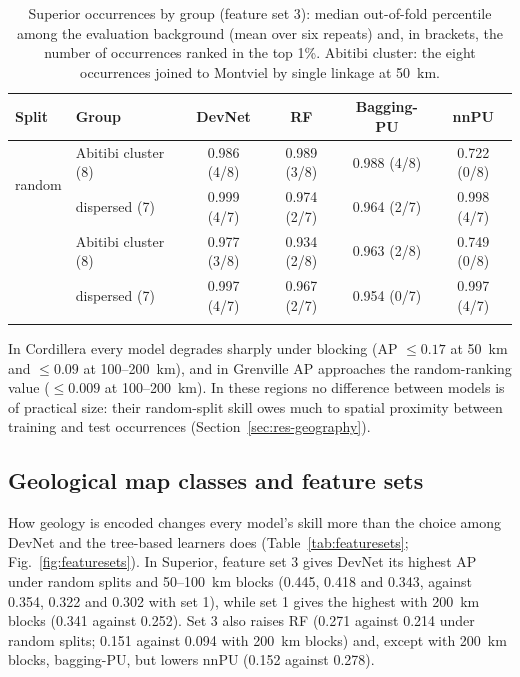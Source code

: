 \documentclass[pdflatex,sn-apa]{sn-jnl}
\begin{document}
\begin{table}[t]
\caption{Superior occurrences by group (feature set 3): median out-of-fold percentile among the evaluation background (mean over six repeats) and, in brackets, the number of occurrences ranked in the top 1\%. Abitibi cluster: the eight occurrences joined to Montviel by single linkage at 50~km.}\label{tab:occurrence}
\scriptsize
\setlength{\tabcolsep}{2.5pt}
\begin{tabular*}{\textwidth}{@{\extracolsep\fill}llcccc}
\toprule
Split & Group & DevNet & RF & Bagging-PU & nnPU \\
\midrule
\multirow{2}{*}{random} & Abitibi cluster (8) & 0.986 (4/8) & 0.989 (3/8) & 0.988 (4/8) & 0.722 (0/8) \\
 & dispersed (7) & 0.999 (4/7) & 0.974 (2/7) & 0.964 (2/7) & 0.998 (4/7) \\
\addlinespace
\multirow{2}{*}{100 km} & Abitibi cluster (8) & 0.977 (3/8) & 0.934 (2/8) & 0.963 (2/8) & 0.749 (0/8) \\
 & dispersed (7) & 0.997 (4/7) & 0.967 (2/7) & 0.954 (0/7) & 0.997 (4/7) \\
\botrule
\end{tabular*}
\end{table}

In Cordillera every model degrades sharply under blocking (AP $\leq 0.17$ at 50~km and $\leq 0.09$ at 100--200~km), and in Grenville AP approaches the random-ranking value ($\leq 0.009$ at 100--200~km). In these regions no difference between models is of practical size: their random-split skill owes much to spatial proximity between training and test occurrences (Section~\ref{sec:res-geography}).

\subsection{Geological map classes and feature sets}\label{sec:res-featuresets}

How geology is encoded changes every model's skill more than the choice among DevNet and the tree-based learners does (Table~\ref{tab:featuresets}; Fig.~\ref{fig:featuresets}). In Superior, feature set 3 gives DevNet its highest AP under random splits and 50--100~km blocks (0.445, 0.418 and 0.343, against 0.354, 0.322 and 0.302 with set 1), while set 1 gives the highest with 200~km blocks (0.341 against 0.252). Set 3 also raises RF (0.271 against 0.214 under random splits; 0.151 against 0.094 with 200~km blocks) and, except with 200~km blocks, bagging-PU, but lowers nnPU (0.152 against 0.278).
\end{document}
